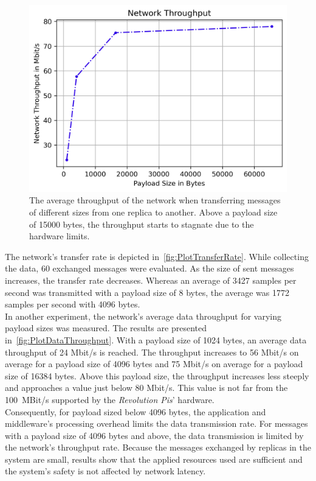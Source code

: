 \begin{figure}[!htb]
	\centering
	\includegraphics[width=0.8\linewidth]{images/plots/dataThroughput}
	\caption{The average throughput of the network when transferring messages of different sizes from one replica to another. Above a payload size of 15000 bytes, the throughput starts to stagnate due to the  hardware limits.}
	\label{fig:PlotDataThroughput}
\end{figure}

The network's transfer rate is depicted in~\autoref{fig:PlotTransferRate}.
While collecting the data, 60 exchanged messages were evaluated.
As the size of sent messages increases, the transfer rate decreases.
Whereas an average of 3427 samples per second was transmitted with a payload size of 8 bytes, the average was 1772 samples per second with 4096 bytes.
\\

In another experiment, the network's average data throughput for varying payload sizes was measured.
The results are presented in~\autoref{fig:PlotDataThroughput}.
With a payload size of 1024 bytes, an average data throughput of 24 Mbit/s is reached.
The throughput increases to 56 Mbit/s on average for a payload size of 4096 bytes and 75 Mbit/s on average for a payload size of 16384 bytes.
Above this payload size, the throughput increases less steeply and approaches a value just below 80 Mbit/s.
This value is not far from the 100~MBit/s supported by the \textit{Revolution Pis}' hardware.
\\

Consequently, for payload sized below 4096 bytes, the application and middleware's processing overhead limits the data transmission rate.
For messages with a payload size of 4096 bytes and above, the data transmission is limited by the network's throughput rate.
Because the messages exchanged by replicas in the system are small, results show that the applied resources used are sufficient and the system's safety is not affected by network latency.
\\

